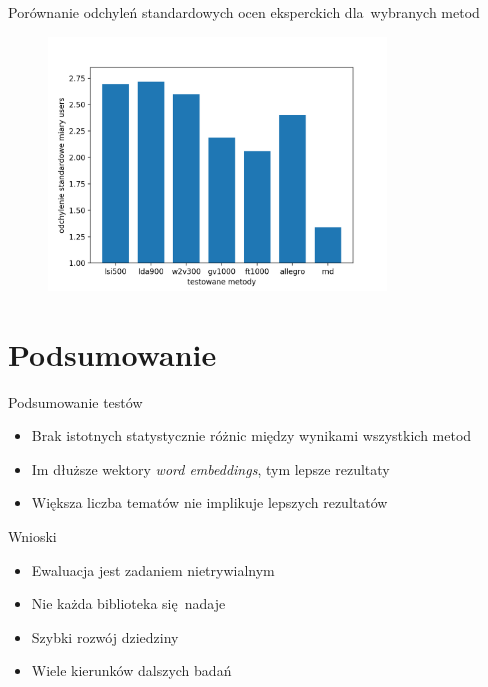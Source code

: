 \documentclass{beamer}
\begin{document}
	\begin{frame}{Porównanie odchyleń standardowych ocen eksperckich dla~wybranych metod}
		\begin{figure}[H]
			\centering
			\includegraphics[width=0.8\textwidth]{img/results/lsi500_lda900_w2v300_gv1000_ft1000_allegro_rnd_users_std.png}
		\end{figure}
	\end{frame}
	\section{Podsumowanie}
	\begin{frame}{Podsumowanie testów}
		\begin{itemize}
			\item Brak istotnych statystycznie różnic między wynikami wszystkich metod
			\item Im dłuższe wektory \emph{word embeddings}, tym lepsze rezultaty
			\item Większa liczba tematów nie implikuje lepszych rezultatów
		\end{itemize}
	\end{frame}
	\begin{frame}{Wnioski}
		\begin{itemize}
			\item Ewaluacja jest zadaniem nietrywialnym
			\item Nie każda biblioteka się nadaje
			\item Szybki rozwój dziedziny
			\item Wiele kierunków dalszych badań
		\end{itemize}
	\end{frame}
\end{document}
